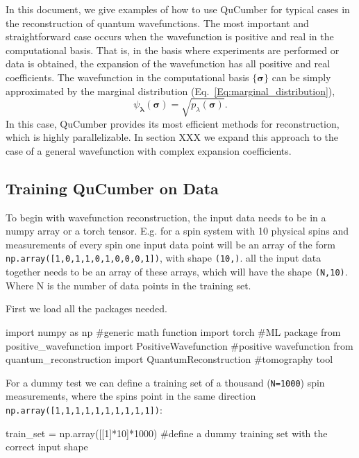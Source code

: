 \documentclass[submission, Phys]{SciPost}
\begin{document}
In this document, we give examples of how to use QuCumber for typical cases in the reconstruction of quantum wavefunctions.  
The most important and straightforward case occurs when the wavefunction is positive and real in the computational basis.  That is, in the basis where experiments are performed or data is obtained, the expansion of the wavefunction has all positive and real coefficients.  The wavefunction in the computational basis $\{ \bm{\sigma} \}$ can be simply approximated by the marginal distribution (Eq.~\ref{Eq:marginal_distribution}), 
\begin{equation}
\psi_{\bm{\lambda}}(\bm{\sigma}) = \sqrt{p_{\lambda} ( \bm{\sigma})}.  \label{PDwavef}
\end{equation}
In this case, QuCumber provides its most efficient methods for reconstruction, which is highly parallelizable.  In section XXX we expand this approach to the case of a general wavefunction with complex expansion coefficients.

\subsection{Training QuCumber on Data}

To begin with wavefunction reconstruction, the input data needs to be in a numpy array or a torch tensor. E.g. for a spin system with 10 physical spins and measurements of every spin one input data point will be an array of the form \verb|np.array([1,0,1,1,0,1,0,0,0,1])|, with shape \verb|(10,)|. all the input data together needs to be an array of these arrays, which will have the shape \verb|(N,10)|. Where N is the number of data points in the training set.

First we load all the packages needed. 
\begin{python}
import numpy as np 		#generic math function
import torch 			#ML package
from positive_wavefunction import PositiveWavefunction #positive wavefunction
from quantum_reconstruction import QuantumReconstruction #tomography tool
\end{python} 

For a dummy test we can define a training set of a thousand (\verb|N=1000|) spin measurements, where the spins point in the same direction \verb|np.array([1,1,1,1,1,1,1,1,1,1])|:

\begin{python}
train_set = np.array([[1]*10]*1000) #define a dummy training set with the correct input shape
\end{python}
\end{document}

